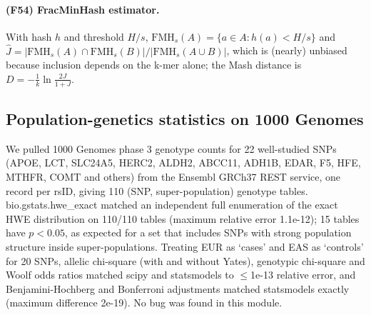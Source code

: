 \paragraph{(F54) FracMinHash estimator.} With hash $h$ and threshold $H/s$, $\mathrm{FMH}_s(A)=\{a\in A:h(a)<H/s\}$ and $\hat J=|\mathrm{FMH}_s(A)\cap\mathrm{FMH}_s(B)|/|\mathrm{FMH}_s(A\cup B)|$, which is (nearly) unbiased because inclusion depends on the k-mer alone; the Mash distance is $D=-\tfrac1k\ln\tfrac{2J}{1+J}$.
\subsection{Population-genetics statistics on 1000 Genomes}
We pulled 1000 Genomes phase 3 genotype counts for 22 well-studied SNPs (APOE, LCT, SLC24A5, HERC2, ALDH2, ABCC11, ADH1B, EDAR, F5, HFE, MTHFR, COMT and others) from the Ensembl GRCh37 REST service, one record per rsID, giving 110 (SNP, super-population) genotype tables. bio.gstats.hwe\_exact matched an independent full enumeration of the exact HWE distribution on 110/110 tables (maximum relative error 1.1e-12); 15 tables have $p<0.05$, as expected for a set that includes SNPs with strong population structure inside super-populations. Treating EUR as `cases' and EAS as `controls' for 20 SNPs, allelic chi-square (with and without Yates), genotypic chi-square and Woolf odds ratios matched scipy and statsmodels to $\le$1e-13 relative error, and Benjamini-Hochberg and Bonferroni adjustments matched statsmodels exactly (maximum difference 2e-19). No bug was found in this module.
